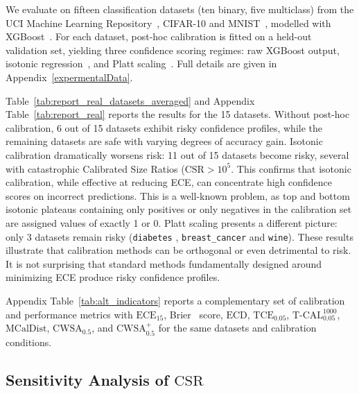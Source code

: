 \documentclass{article}
\theoremstyle{plain}
\theoremstyle{definition}
\theoremstyle{remark}
\begin{document}
We evaluate on fifteen classification datasets (ten binary, five multiclass) from the UCI Machine Learning Repository~\cite{dua2019uci}, CIFAR-10 and MNIST~\cite{lecun1998gradient}, modelled with XGBoost~\cite{chen2016xgboost}. For each dataset, post-hoc calibration is fitted on a held-out validation set, yielding three confidence scoring regimes: raw XGBoost output, isotonic regression~\cite{zadrozny2002transforming}, and Platt scaling~\cite{platt1999probabilistic}. Full details are given in Appendix~\ref{expermentalData}.

Table~\ref{tab:report_real_datasets_averaged} and Appendix Table~\ref{tab:report_real} reports the results for the 15 datasets. Without post-hoc calibration, 6 out of 15 datasets exhibit risky confidence profiles, while the remaining datasets are safe with varying degrees of accuracy gain. Isotonic calibration dramatically worsens risk: 11 out of 15 datasets become risky, several with catastrophic Calibrated Size Ratios ($\mathrm{CSR} > 10^5$. This confirms that isotonic calibration, while effective at reducing ECE, can concentrate high confidence scores on incorrect predictions. This is a well-known problem, as top and bottom isotonic plateaus containing only positives or only negatives in the calibration set are assigned values of exactly 1 or 0. Platt scaling presents a different picture: only 3 datasets remain risky (\texttt{diabetes} , \texttt{breast\_cancer} and \texttt{wine}). These results illustrate that calibration methods can be orthogonal or even detrimental to risk. It is not surprising that standard methods fundamentally designed around minimizing ECE produce risky confidence profiles.  

Appendix Table~\ref{tab:alt_indicators} reports a complementary set of calibration and performance metrics with $\mathrm{ECE}_{15}$, Brier~\cite{brier1950} score, $\mathrm{ECD}$, $\mathrm{TCE}_{0.05}$, $\mathrm{T\text{-}CAL}^{1000}_{0.05}$, $\mathrm{MCalDist}$, $\mathrm{CWSA}_{0.5}$, and $\mathrm{CWSA}^+_{0.5}$ for the same datasets and calibration conditions.


\subsection{Sensitivity Analysis of $\mathrm{CSR}$}
\end{document}
